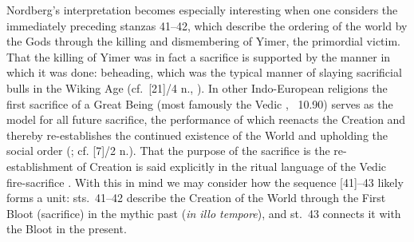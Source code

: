 {Nordberg’s interpretation becomes especially interesting when one considers the immediately preceding stanzas 41--42, which describe the ordering of the world by the Gods through the killing and dismembering of Yimer, the primordial victim.  That the killing of Yimer was in fact a sacrifice is supported by the manner in which it was done: beheading, which was the typical manner of slaying sacrificial bulls in the Wiking Age (cf.~[21]/4 n., \cite{Lucas2007}).
In other Indo-European religions the first sacrifice of a Great Being (most famously the Vedic , \Rigveda\ 10.90) serves as the model for all future sacrifice, the performance of which reenacts the Creation and thereby re-establishes the continued existence of the World and upholding the social order (\cite[\emph{passim}]{Lincoln1986}; cf. [7]/2 n.).  That the purpose of the sacrifice is the re-establishment of Creation is said explicitly in the ritual language of the Vedic fire-sacrifice \parencite[11, 78--80]{EliadeReturn}.
With this in mind we may consider how the sequence [41]--43 likely forms a unit: sts.~41--42 describe the Creation of the World through the First Bloot (sacrifice) in the mythic past (\emph{in illo tempore}), and st.~43 connects it with the Bloot in the present.}%
